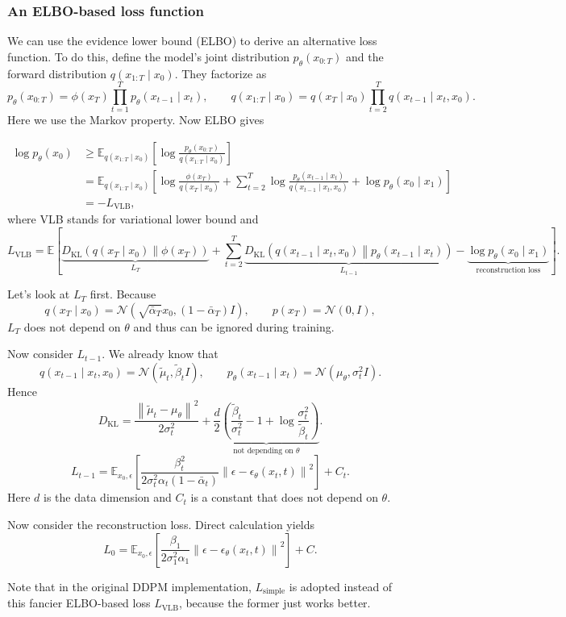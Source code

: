 \documentclass[11pt,a4paper]{article}
\theoremstyle{plain} %
\theoremstyle{definition}
\theoremstyle{remark}
\newcommand{\bra}[1]{\mathopen{}\left(#1\right)}
\newcommand{\sbra}[1]{\mathopen{}\left[#1\right]}
\newcommand{\norm}[1]{\mathopen{}\left\lVert#1\right\rVert}
\newcommand{\N}{\mathbb{N}}
\newcommand{\E}{\mathbb{E}}
\renewcommand{\N}{\mathcal{N}}
\newcommand{\KL}[2]{D_{\mathrm{KL}}\mathopen{}\left(#1\middle\|#2\right)}
\newcommand{\eps}{\epsilon_\theta(x_t,t)}
\begin{document}
\subsubsection{An ELBO-based loss function}

We can use the evidence lower bound (ELBO) to derive an alternative loss function. To do this, define the model's joint distribution $p_\theta(x_{0:T})$ and the forward distribution $q(x_{1:T}\mid x_0)$. They factorize as
\begin{equation}\label{eq:factorize}
    p_\theta(x_{0:T}) = \phi(x_T)\prod_{t=1}^{T}p_\theta(x_{t-1}\mid x_t),\qquad q(x_{1:T}\mid x_0) = q(x_T\mid x_0)\prod_{t=2}^{T}q(x_{t-1}\mid x_t,x_0).
\end{equation}
Here we use the Markov property. Now ELBO gives

\begin{align*}
    \log p_\theta(x_0) &\ge \E_{q(x_{1:T}\mid x_0)}\sbra{\log\frac{p_\theta(x_{0:T})}{q(x_{1:T}\mid x_0)}} \\
    &= \E_{q(x_{1:T}\mid x_0)}\sbra{\log\frac{\phi(x_T)}{q(x_T\mid x_0)}+\sum_{t=2}^{T}\log\frac{p_\theta(x_{t-1}\mid x_t)}{q(x_{t-1}\mid x_t,x_0)}+\log p_\theta(x_0\mid x_1)} \\
    &= -L_{\mathrm{VLB}},
\end{align*}
where VLB stands for variational lower bound and
\[L_{\mathrm{VLB}} = \E\sbra{\underbrace{\KL{q(x_T\mid x_0)}{\phi(x_T)}}_{L_T} + \sum_{t=2}^{T}\underbrace{\KL{q(x_{t-1}\mid x_t,x_0)}{p_\theta(x_{t-1}\mid x_t)}}_{L_{t-1}} - \underbrace{\log p_\theta(x_0\mid x_1)}_{\text{reconstruction loss}}}.\]

Let's look at $L_T$ first. Because
\[q(x_T\mid x_0)=\N(\sqrt{\bar\alpha_T}x_0,(1-\bar\alpha_T)I),\qquad p(x_T)=\N(0,I),\]
$L_T$ does not depend on $\theta$ and thus can be ignored during training.

Now consider $L_{t-1}$. We already know that
\[q(x_{t-1}\mid x_t,x_0)=\N(\tilde\mu_t,\tilde\beta_tI),\qquad p_\theta(x_{t-1}\mid x_t)=\N(\mu_\theta,\sigma_t^2I).\]
Hence
\[D_{\mathrm{KL}}=\frac{\norm{\tilde\mu_t-\mu_\theta}^2}{2\sigma_t^2}+\underbrace{\frac d2\bra{\frac{\tilde\beta_t}{\sigma_t^2}-1+\log\frac{\sigma_t^2}{\tilde\beta_t}}}_{\text{not depending on $\theta$}}.\]
\[L_{t-1}=\E_{x_0,\epsilon}\sbra{\frac{\beta_t^2}{2\sigma_t^2\alpha_t(1-\bar\alpha_t)}\norm{\epsilon-\eps}^2}+C_t.\]
Here $d$ is the data dimension and $C_t$ is a constant that does not depend on $\theta$.

Now consider the reconstruction loss. Direct calculation yields
\[L_0=\E_{x_0,\epsilon}\sbra{\frac{\beta_1}{2\sigma_1^2\alpha_1}\norm{\epsilon-\eps}^2}+C.\]

Note that in the original DDPM implementation, $L_{\mathrm{simple}}$ is adopted instead of this fancier ELBO-based loss $L_{\mathrm{VLB}}$, because the former just works better.



\end{document}
